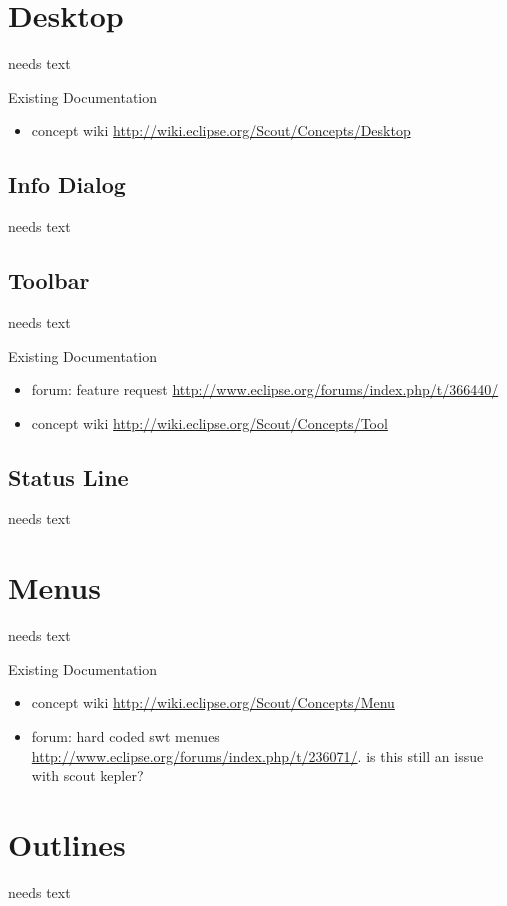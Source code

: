 \documentclass[a4paper,10pt,twoside]{book}
\begin{document}
{%
\section{Desktop}
needs text

\noindent Existing Documentation
\begin{itemize}
  \item concept wiki \url{http://wiki.eclipse.org/Scout/Concepts/Desktop}
\end{itemize}

\subsection{Info Dialog}
needs text

\subsection{Toolbar}
needs text

\noindent Existing Documentation
\begin{itemize}
  \item forum: feature request \url{http://www.eclipse.org/forums/index.php/t/366440/}
  \item concept wiki \url{http://wiki.eclipse.org/Scout/Concepts/Tool}
\end{itemize}

\subsection{Status Line}
needs text

\section{Menus}
needs text

\noindent Existing Documentation
\begin{itemize}
  \item concept wiki \url{http://wiki.eclipse.org/Scout/Concepts/Menu}
  \item forum: hard coded swt menues \url{http://www.eclipse.org/forums/index.php/t/236071/}. is this still an issue with scout kepler?
\end{itemize}

\section{Outlines}
needs text

}
\end{document}
